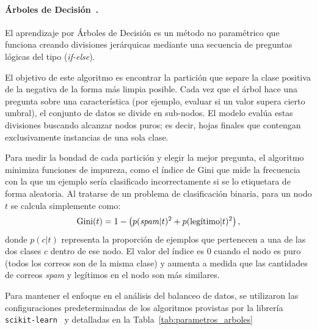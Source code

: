 \documentclass[a4paper,11pt ,openany]{book}
\begin{document}
\paragraph{Árboles de Decisión~\cite{breiman1984classification}.} {
El aprendizaje por Árboles de Decisión es un método no paramétrico que funciona creando divisiones jerárquicas mediante una secuencia de preguntas lógicas del tipo (\textit{if-else}). 

El objetivo de este algoritmo es encontrar la partición que separe la clase positiva de la negativa de la forma más limpia posible. Cada vez que el árbol hace una pregunta sobre una característica (por ejemplo, evaluar si un valor supera cierto umbral), el conjunto de datos se divide en sub-nodos. El modelo evalúa estas divisiones buscando alcanzar nodos puros; es decir, hojas finales que contengan exclusivamente instancias de una sola clase. 

Para medir la bondad de cada partición y elegir la mejor pregunta, el algoritmo minimiza funciones de impureza, como el índice de Gini que mide la frecuencia con la que un ejemplo sería clasificado incorrectamente si se lo etiquetara de forma aleatoria. Al tratarse de un problema de clasificación binaria, para un nodo $t$ se calcula simplemente como:
\begin{equation}
	\text{Gini}(t) = 1 - \left( p(\text{\textit{spam}}|t)^2 + p(\text{legítimo}|t)^2 \right)
	\label{eq:gini},
\end{equation}
donde $p(c|t)$ representa la proporción de ejemplos que pertenecen a una de las dos clases $c$ dentro de ese nodo. El valor del índice es $0$ cuando el nodo es puro (todos los correos son de la misma clase) y aumenta a medida que las cantidades de correos \textit{spam} y legítimos en el nodo son más similares.

Para mantener el enfoque en el análisis del balanceo de datos, se utilizaron las configuraciones predeterminadas de los algoritmos provistas por la librería \texttt{scikit-learn}~\cite{pedregosa2011scikit} y detalladas en la Tabla~\ref{tab:parametros_arboles}

}
\end{document}
